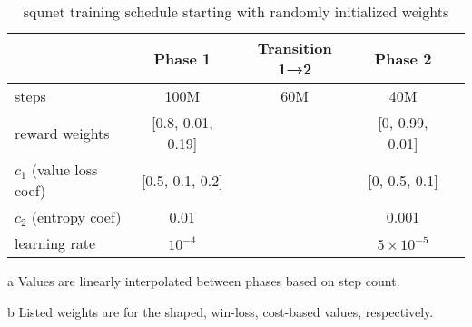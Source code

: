 \documentclass[conference,onecolumn]{IEEEtran}
\newcounter{supptable}
\newenvironment{supptable}
  {\renewcommand{\tablename}{Supplemental Table}\setcounter{table}{\value{supptable}}\addtocounter{supptable}{1}\begin{table}}
  {\end{table}\setcounter{supptable}{\value{table}}}
\begin{document}
\begin{supptable}[H]
    \centering
    \begin{threeparttable}
    \caption{squnet training schedule starting with randomly initialized weights}
    \label{tab:squnet-training-schedule}
    \begin{tabular}{lcccc}
    \toprule
     & Phase 1 & Transition 1→2\tnote{a} & Phase 2 \\
     \midrule
    steps & 100M & 60M & 40M \\
    reward weights\tnote{b} & [0.8, 0.01, 0.19] &  & [0, 0.99, 0.01] \\
    $c_1$ (value loss coef)\tnote{b} & [0.5, 0.1, 0.2] &  & [0, 0.5, 0.1]\\
    $c_2$ (entropy coef) & 0.01 & & 0.001 \\
    learning rate & $10^{-4}$ & & $5 \times 10^{-5}$ \\
    \bottomrule
    \end{tabular}
    \begin{tablenotes}
       \item[a] Values are linearly interpolated between phases based on step count.
       \item[b] Listed weights are for the shaped, win-loss, cost-based values, respectively.
    \end{tablenotes}
    \end{threeparttable}
\end{supptable}
\end{document}
